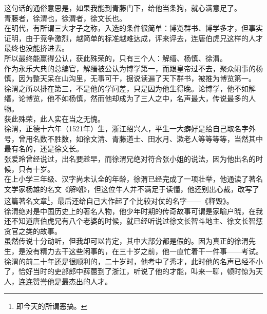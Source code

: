 \begin{multicols}{\theparacolNo}
这句话的通俗意思是，如果我能到青藤门下，给他当条狗，就心满意足了。\\

青藤者，徐渭也，徐渭者，徐文长也。\\

在明代，有所谓三大才子之称，入选的条件很简单：博览群书、博学多才，但事实证明，由于竞争激烈，越简单的标准越难达成，评来评去，连唐伯虎兄这样的人才最终也没能挤进去。\\

所以最终能赢得公认，获此殊荣的，只有三个人：解缙、杨慎、徐渭。\\

作为永乐大典的总编官，解缙被公认为博学第一，而跟皇帝过不去，聚众闹事的杨慎，因为整天呆在山沟里，无事可干，据说读遍了天下群书，被推为博览第一。\\

徐渭之所以排在第三，不是他的学问差，只是因为他生得晚。论博学，他不如解缙，论博览，他不如杨慎，然而他却成为了三人之中，名声最大，传说最多的人物。\\

获此殊荣，此人实在当之无愧。\\

徐渭，正德十六年（1521年）生，浙江绍兴人，平生一大癖好是给自己取名字外号，曾用名数不胜数，如徐文清、青藤道士、田水月、漱老人等等等等，当然其中最有名的，还是徐文长。\\

张爱玲曾经说过，出名要趁早，而徐渭兄绝对符合张小姐的说法，因为他出名的时候，只有十岁。\\

在上小学三年级、汉字尚未认全的年龄，徐渭已经完成了一项壮举，他通读了著名文学家杨雄的名文《解嘲》，但这位牛人并不满足于读懂，他还别出心裁，改写了这篇著名文章\footnote{即今天的所谓恶搞。}，最后还给自己大作起了个比较对仗的名字——《释毁》。\\

徐渭绝对是中国历史上的著名人物，他少年时期的传奇故事可谓是家喻户晓，在我还不知道唐伯虎兄有八个老婆的时候，就已经听说过徐文长智斗地主、徐文长智惩贪官之类的故事。\\

虽然传说十分动听，但我却可以肯定，其中大部分都是假的。因为真正的徐渭先生，是没有精力去干这些闲事的，在三十岁之前，他一直忙着干一件事——考试。\\

徐渭的前二十年还是很顺利的，二十岁时，他考中了秀才，此时他的名声已经不小了，恰好当时的吏部郎中薛蕙到了浙江，听说了他的才能，叫来一聊，顿时惊为天人，连连赞誉他是最杰出的人才。\\


\end{multicols}
